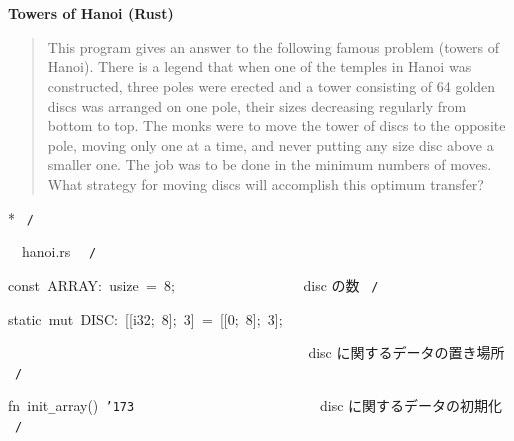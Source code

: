 \documentclass[a4paper,10pt]{article}
\def\mc{\relax}
\begin{document}
\tt\mc 

\noindent
\mbox{}\rm\mc {\tt /}{\tt *}\  \hrulefill *


\ %

\centerline{\bf Towers of Hanoi (Rust)}

\begin{quote}

This program gives an answer to the following famous problem (towers of
Hanoi).
There is a legend that when one of the temples in Hanoi was constructed,
three poles were erected and a tower consisting of 64 golden discs was
arranged on one pole, their sizes decreasing regularly from bottom to top.
The monks were to move the tower of discs to the opposite pole, moving
only one at a time, and never putting any size disc above a smaller one.
The job was to be done in the minimum numbers of moves. What strategy for
moving discs will accomplish this optimum transfer?
\end{quote}


* \hrulefill \rm\mc \ {\tt *}{\tt /}
\tt\mc 

\noindent
\mbox{}\hfill

\noindent
\mbox{}\hfill

\noindent
\mbox{}\rm\mc {\tt /}{\tt *}\  \hrulefill\ hanoi.rs \ \hrulefill \rm\mc \ {\tt *}{\tt /}
\tt\mc 

\noindent
\mbox{}\hfill

\noindent
\mbox{}\hfill

\noindent
\mbox{}const{\tt\mc \ }ARRAY:{\tt\mc \ }usize{\tt\mc \ }={\tt\mc \ }8;{\tt\mc \ \ \ \ \ \ \ \ }{\tt\mc \ \ \ \ \ \ \ \ }\rm\mc {\tt /}{\tt *}\  \ disc の数 \hfill \rm\mc \ {\tt *}{\tt /}
\tt\mc 

\noindent
\mbox{}\hfill

\noindent
\mbox{}static{\tt\mc \ }mut{\tt\mc \ }DISC:{\tt\mc \ }[[i32;{\tt\mc \ }8];{\tt\mc \ }3]{\tt\mc \ }={\tt\mc \ }[[0;{\tt\mc \ }8];{\tt\mc \ }3];

\noindent
\mbox{}{\tt\mc \ \ \ \ \ \ \ \ }{\tt\mc \ \ \ \ \ \ \ \ }{\tt\mc \ \ \ \ \ \ \ \ }{\tt\mc \ \ \ \ \ \ \ \ }{\tt\mc \ \ \ \ \ \ \ \ }\rm\mc {\tt /}{\tt *}\  \ disc に関するデータの置き場所
					   \hfill \rm\mc \ {\tt *}{\tt /}
\tt\mc 

\noindent
\mbox{}\hfill

\noindent
\mbox{}fn{\tt\mc \ }init{\tt\_}array(){\tt\mc \ }{\tt\char'173}{\tt\mc \ \ \ \ \ \ \ \ }{\tt\mc \ \ \ \ \ \ \ \ }{\tt\mc \ \ \ \ \ \ \ \ }\rm\mc {\tt /}{\tt *}\  \ disc に関するデータの初期化
					   \hfill \rm\mc \ {\tt *}{\tt /}
\tt\mc 
\end{document}
